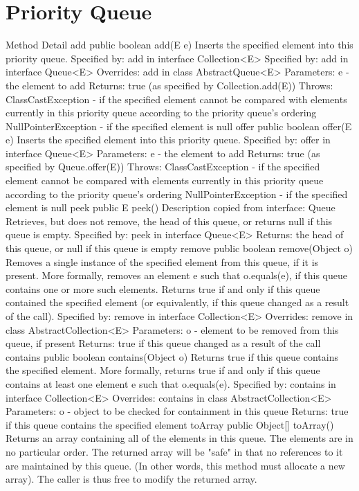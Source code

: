 \documentclass[babel]{book}
\begin{document}
\section{Priority Queue}
Method Detail
add
public boolean add(E e)
Inserts the specified element into this priority queue.
Specified by:
add in interface Collection<E>
Specified by:
add in interface Queue<E>
Overrides:
add in class AbstractQueue<E>
Parameters:
e - the element to add
Returns:
true (as specified by Collection.add(E))
Throws:
ClassCastException - if the specified element cannot be compared with elements currently in this priority queue according to the priority queue's ordering
NullPointerException - if the specified element is null
offer
public boolean offer(E e)
Inserts the specified element into this priority queue.
Specified by:
offer in interface Queue<E>
Parameters:
e - the element to add
Returns:
true (as specified by Queue.offer(E))
Throws:
ClassCastException - if the specified element cannot be compared with elements currently in this priority queue according to the priority queue's ordering
NullPointerException - if the specified element is null
peek
public E peek()
Description copied from interface: Queue
Retrieves, but does not remove, the head of this queue, or returns null if this queue is empty.
Specified by:
peek in interface Queue<E>
Returns:
the head of this queue, or null if this queue is empty
remove
public boolean remove(Object o)
Removes a single instance of the specified element from this queue, if it is present. More formally, removes an element e such that o.equals(e), if this queue contains one or more such elements. Returns true if and only if this queue contained the specified element (or equivalently, if this queue changed as a result of the call).
Specified by:
remove in interface Collection<E>
Overrides:
remove in class AbstractCollection<E>
Parameters:
o - element to be removed from this queue, if present
Returns:
true if this queue changed as a result of the call
contains
public boolean contains(Object o)
Returns true if this queue contains the specified element. More formally, returns true if and only if this queue contains at least one element e such that o.equals(e).
Specified by:
contains in interface Collection<E>
Overrides:
contains in class AbstractCollection<E>
Parameters:
o - object to be checked for containment in this queue
Returns:
true if this queue contains the specified element
toArray
public Object[] toArray()
Returns an array containing all of the elements in this queue. The elements are in no particular order.
The returned array will be "safe" in that no references to it are maintained by this queue. (In other words, this method must allocate a new array). The caller is thus free to modify the returned array.
\end{document}
